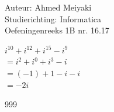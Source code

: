\documentclass[a4paper]{article}
\begin{document}
  
\noindent \large Auteur: Ahmed Meiyaki \\
\noindent \large Studierichting: Informatica\\
\noindent \large Oefeningenreeks 1B nr. 16.17\\

\medskip

\normalsize

$ i^{10} + i^{12} + i^{15} - i^9 $ \\

$=i^2 + i^0 + i^3 - i $ \\

$=(-1) + 1 - i - i $\\

$= -2i $ \\

\begin{thebibliography}{999}
\end{thebibliography}
\end{document}
